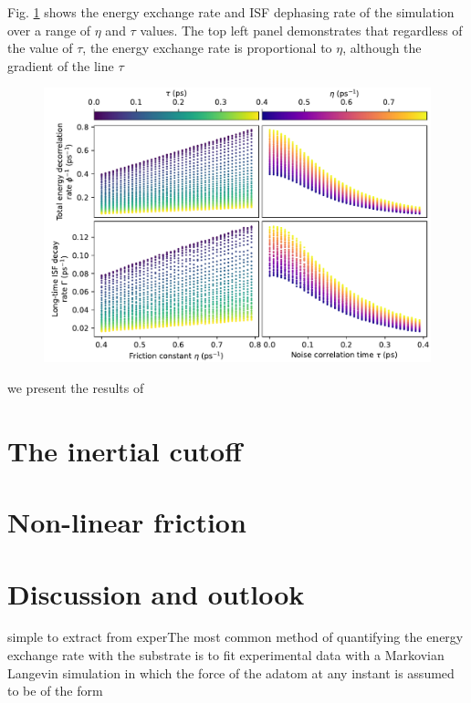 \documentclass[7pt]{article}
\begin{document}
Fig. \ref{fig:eta_tau_ttf_gamma} shows the energy exchange rate and ISF dephasing rate of the simulation over a range of $\eta$ and $\tau$ values. The top left panel demonstrates that regardless of the value of $\tau$, the energy exchange rate is proportional to $\eta$, although the gradient of the line  $\tau$

\begin{figure}
	\centering
	\includegraphics[width=1.0\textwidth]{eta_tau_ttf_gamma}
	\caption{}
	\label{fig:eta_tau_ttf_gamma}
\end{figure}

 we present the results of  

\section*{The inertial cutoff}

\section*{Non-linear friction}

\section*{Discussion and outlook}

simple to extract from experThe most common method of quantifying the energy exchange rate with the substrate is to fit experimental data with a Markovian Langevin simulation in which the force of the adatom at any instant is assumed to be of the form 
\end{document}
